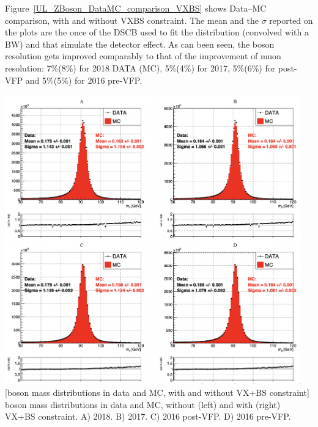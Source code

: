 Figure~\ref{UL_ZBoson_DataMC_comparison_VXBS} shows Data--MC comparison, with and without VXBS constraint.
The mean and the $\sigma$ reported on the plots are the once of the DSCB used to fit the distribution (convolved with a BW) and that simulate the detector effect.
As can been seen, the \PZ boson resolution gets improved comparably to that of the improvement of muon \pT resolution:
7\%(8\%) for 2018 DATA (MC), 5\%(4\%) for 2017, 5\%(6\%) for post-VFP and 5\%(5\%) for 2016 pre-VFP. 
\begin{multiFigure}
\begin{center}
	\includegraphics[width=0.96\textwidth]{figures/higgsmassmeas/vxbs/vxbs_mZdist_2017_2018.png}
        [\PZ boson mass distributions in data and MC, with and without VX+BS constraint]
        {\PZ boson mass distributions in data and MC, without (left) and with (right) VX+BS constraint. %
        \;A) 2018.
        \;B) 2017.
        \;C) 2016 post-VFP.
        \;D) 2016 pre-VFP.
        } %
\label{UL_ZBoson_DataMC_comparison_VXBS}
\end{center}
\end{multiFigure}



